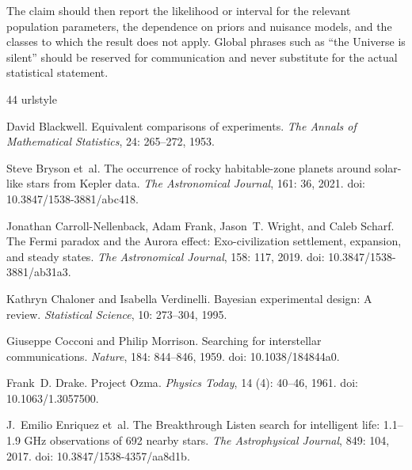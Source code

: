 \documentclass[11pt,a4paper]{article}
\begin{document}
The claim should then report the likelihood or interval for the relevant population parameters, the dependence on priors and nuisance models, and the classes to which the result does not apply. Global phrases such as ``the Universe is silent'' should be reserved for communication and never substitute for the actual statistical statement.

\begin{thebibliography}{44}
\providecommand{\natexlab}[1]{#1}
\providecommand{\url}[1]{\texttt{#1}}
\expandafter\ifx\csname urlstyle\endcsname\relax
  \providecommand{\doi}[1]{doi: #1}\else
  \providecommand{\doi}{doi: \begingroup \urlstyle{rm}\Url}\fi

David Blackwell.
\newblock Equivalent comparisons of experiments.
\newblock \emph{The Annals of Mathematical Statistics}, 24: 265--272,
  1953.

Steve Bryson et~al.
\newblock The occurrence of rocky habitable-zone planets around solar-like
  stars from {Kepler} data.
\newblock \emph{The Astronomical Journal}, 161: 36, 2021.
\newblock \doi{10.3847/1538-3881/abc418}.

Jonathan Carroll-Nellenback, Adam Frank, Jason~T. Wright, and Caleb Scharf.
\newblock The {Fermi} paradox and the {Aurora} effect: Exo-civilization
  settlement, expansion, and steady states.
\newblock \emph{The Astronomical Journal}, 158: 117, 2019.
\newblock \doi{10.3847/1538-3881/ab31a3}.

Kathryn Chaloner and Isabella Verdinelli.
\newblock Bayesian experimental design: A review.
\newblock \emph{Statistical Science}, 10: 273--304, 1995.

Giuseppe Cocconi and Philip Morrison.
\newblock Searching for interstellar communications.
\newblock \emph{Nature}, 184: 844--846, 1959.
\newblock \doi{10.1038/184844a0}.

Frank~D. Drake.
\newblock Project {Ozma}.
\newblock \emph{Physics Today}, 14 (4): 40--46, 1961.
\newblock \doi{10.1063/1.3057500}.

J.~Emilio Enriquez et~al.
\newblock The {Breakthrough Listen} search for intelligent life: 1.1--1.9 {GHz}
  observations of 692 nearby stars.
\newblock \emph{The Astrophysical Journal}, 849: 104, 2017.
\newblock \doi{10.3847/1538-4357/aa8d1b}.


\end{thebibliography}
\end{document}
